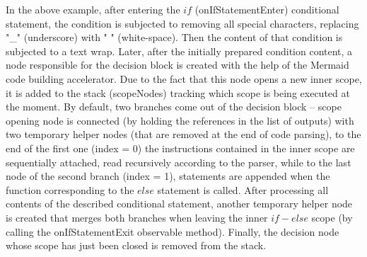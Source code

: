 In the above example, after entering the $if$ (onIfStatementEnter) conditional statement, the condition is subjected to removing all special characters, replacing "\_" (underscore) with " " (white-space). Then the content of that condition is subjected to a text wrap. Later, after the initially prepared condition content, a node responsible for the decision block is created with the help of the Mermaid code building accelerator. Due to the fact that this node opens a new inner scope, it is added to the stack (scopeNodes) tracking which scope is being executed at the moment. By default, two branches come out of the decision block -- scope opening node is connected (by holding the references in the list of outputs) with two temporary helper nodes (that are removed at the end of code parsing), to the end of the first one (index = 0) the instructions contained in the inner scope are sequentially attached, read recursively according to the parser, while to the last node of the second branch (index = 1), statements are appended when the function corresponding to the $else$ statement is called. After processing all contents of the described conditional statement, another temporary helper node is created that merges both branches when leaving the inner $if-else$ scope (by calling the onIfStatementExit observable method). Finally, the decision node whose scope has just been closed is removed from the stack.
